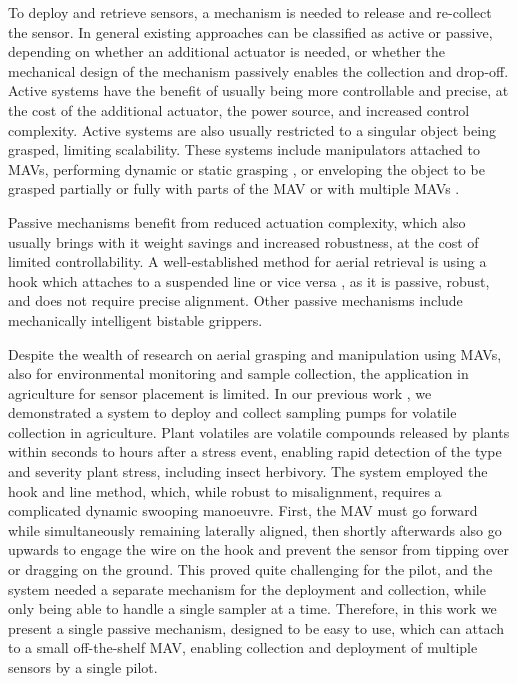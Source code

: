 To deploy and retrieve sensors, a mechanism is needed to release and re-collect the sensor. In general existing approaches can be classified as active or passive, depending on whether an additional actuator is needed, or whether the mechanical design of the mechanism passively enables the collection and drop-off. Active systems have the benefit of usually being more controllable and precise, at the cost of the additional actuator, the power source, and increased control complexity. Active systems are also usually restricted to a singular object being grasped, limiting scalability. These systems include manipulators attached to \glspl{MAV}, performing dynamic or static grasping \cite{Ollero2022, Fishman2021, Kim2018c, Orsag2014, Suarez2017, Lee2021a, Roderick2021}, or enveloping the object to be grasped partially or fully with parts of the \gls{MAV} or with multiple \glspl{MAV} \cite{Hingston2020, Gabrich2018, Bamert, Zhao2017}.

Passive mechanisms benefit from reduced actuation complexity, which also usually brings with it weight savings and increased robustness, at the cost of limited controllability. A well-established method for aerial retrieval is using a hook which attaches to a suspended line or vice versa \cite{Leary, Geckeler2023a, Jiang2023}, as it is passive, robust, and does not require precise alignment. Other passive mechanisms include mechanically intelligent bistable grippers\cite{Firouzeh2023, Hsiao2022, Geckeler2022a}.

Despite the wealth of research on aerial grasping and manipulation using \glspl{MAV}, also for environmental monitoring and sample collection, the application in agriculture for sensor placement is limited. In our previous work \cite{Geckeler2023a}, we demonstrated a system to deploy and collect sampling pumps for volatile collection in agriculture. Plant volatiles are volatile compounds released by plants within seconds to hours after a stress event, enabling rapid detection of the type and severity plant stress, including insect herbivory. The system employed the hook and line method, which, while robust to misalignment, requires a complicated dynamic swooping manoeuvre. First, the \gls{MAV} must go forward while simultaneously remaining laterally aligned, then shortly afterwards also go upwards to engage the wire on the hook and prevent the sensor from tipping over or dragging on the ground. This proved quite challenging for the pilot, and the system needed a separate mechanism for the deployment and collection, while only being able to handle a single sampler at a time. Therefore, in this work we present a single passive mechanism, designed to be easy to use, which can attach to a small off-the-shelf \gls{MAV}, enabling collection and deployment of multiple sensors by a single pilot. 



